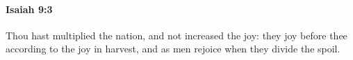 
		\paragraph{Isaiah 9:3} %
			\label{ISAIAH-9-3}

			Thou hast multiplied the nation, and not increased the joy: they joy before thee according to the joy in harvest, and as men rejoice when they divide the spoil.


